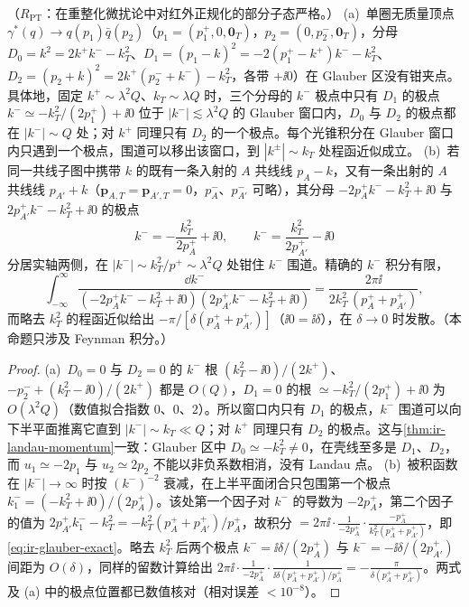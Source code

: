\begin{proposition}\label{prop:ir-glauber-trapping}
（$R_{\mathrm{PT}}$：在重整化微扰论中对红外正规化的部分子态严格。）
(a)~单圈无质量顶点 $\gamma^*(q)\to q(p_1)\bar q(p_2)$（$p_1=(p_1^+,0,\mathbf 0_T)$，$p_2=(0,p_2^-,\mathbf 0_T)$，分母 $D_0=k^2=2k^+k^--k_T^2$、$D_1=(p_1-k)^2=-2(p_1^+-k^+)k^--k_T^2$、$D_2=(p_2+k)^2=2k^+(p_2^-+k^-)-k_T^2$，各带 $+\ii0$）在 Glauber 区没有钳夹点。具体地，固定 $k^+\sim\lambda^2Q$、$k_T\sim\lambda Q$ 时，三个分母的 $k^-$ 极点中只有 $D_1$ 的极点 $k^-\simeq-k_T^2/(2p_1^+)+\ii0$ 位于 $|k^-|\lesssim\lambda^2Q$ 的 Glauber 窗口内，$D_0$ 与 $D_2$ 的极点都在 $|k^-|\sim Q$ 处；对 $k^+$ 同理只有 $D_2$ 的一个极点。每个光锥积分在 Glauber 窗口内只遇到一个极点，围道可以移出该窗口，到 $|k^\pm|\sim k_T$ 处程函近似成立。
(b)~若同一共线子图中携带 $k$ 的既有一条入射的 $A$ 共线线 $p_A-k$，又有一条出射的 $A$ 共线线 $p_{A'}+k$（$\mathbf p_{A,T}=\mathbf p_{A',T}=0$，$p_A^-$、$p_{A'}^-$ 可略），其分母 $-2p_A^+k^--k_T^2+\ii0$ 与 $2p_{A'}^+k^--k_T^2+\ii0$ 的极点
\begin{equation}\label{eq:ir-glauber-poles}
k^-=-\frac{k_T^2}{2p_A^+}+\ii0,\qquad k^-=\frac{k_T^2}{2p_{A'}^+}-\ii0
\end{equation}
分居实轴两侧，在 $|k^-|\sim k_T^2/p^+\sim\lambda^2Q$ 处钳住 $k^-$ 围道。精确的 $k^-$ 积分有限，
\begin{equation}\label{eq:ir-glauber-exact}
\int_{-\infty}^{\infty}\frac{\dd k^-}{(-2p_A^+k^--k_T^2+\ii0)(2p_{A'}^+k^--k_T^2+\ii0)}=\frac{2\pi\ii}{2k_T^2\,(p_A^++p_{A'}^+)} ,
\end{equation}
而略去 $k_T^2$ 的程函近似给出 $-\pi/[\delta(p_A^++p_{A'}^+)]$（$\ii0=\ii\delta$），在 $\delta\to0$ 时发散。（本命题只涉及 Feynman 积分。）
\end{proposition}
\begin{proof}
(a)~$D_0=0$ 与 $D_2=0$ 的 $k^-$ 根 $(k_T^2-\ii0)/(2k^+)$、$-p_2^-+(k_T^2-\ii0)/(2k^+)$ 都是 $O(Q)$，$D_1=0$ 的根 $\simeq-k_T^2/(2p_1^+)+\ii0$ 为 $O(\lambda^2Q)$（数值拟合指数 $0$、$0$、$2$）。所以窗口内只有 $D_1$ 的极点，$k^-$ 围道可以向下半平面推离它直到 $|k^-|\sim k_T\ll Q$；对 $k^+$ 同理只有 $D_2$ 的极点。这与\cref{thm:ir-landau-momentum}一致：Glauber 区中 $D_0\simeq-k_T^2\ne0$，在壳线至多是 $D_1$、$D_2$，而 $u_1\simeq-2p_1$ 与 $u_2\simeq2p_2$ 不能以非负系数相消，没有 Landau 点。
(b)~被积函数在 $|k^-|\to\infty$ 时按 $(k^-)^{-2}$ 衰减，在上半平面闭合只包围第一个极点 $k^-_1=(-k_T^2+\ii0)/(2p_A^+)$。该处第一个因子对 $k^-$ 的导数为 $-2p_A^+$，第二个因子的值为 $2p_{A'}^+k^-_1-k_T^2=-k_T^2(p_A^++p_{A'}^+)/p_A^+$，故积分 $=2\pi\ii\cdot\frac{1}{-2p_A^+}\cdot\frac{-p_A^+}{k_T^2(p_A^++p_{A'}^+)}$，即\cref{eq:ir-glauber-exact}。略去 $k_T^2$ 后两个极点 $k^-=\ii\delta/(2p_A^+)$ 与 $k^-=-\ii\delta/(2p_{A'}^+)$ 间距为 $O(\delta)$，同样的留数计算给出 $2\pi\ii\cdot\frac1{-2p_A^+}\cdot\frac{1}{\ii\delta(p_A^++p_{A'}^+)/p_A^+}=-\frac{\pi}{\delta(p_A^++p_{A'}^+)}$。两式及 (a) 中的极点位置都已数值核对（相对误差 $<10^{-8}$）。
\end{proof}

